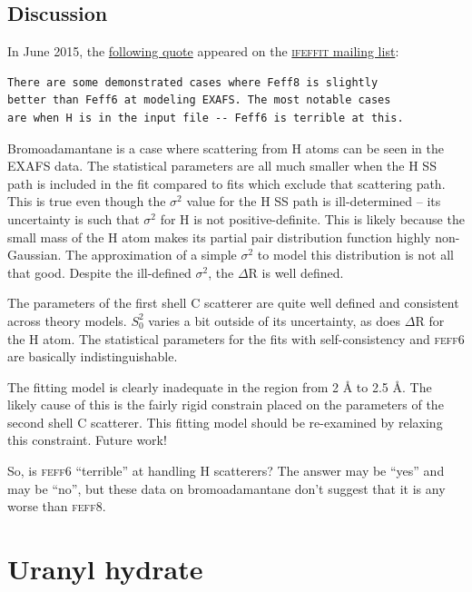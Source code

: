 \documentclass[11pt]{article}
\begin{document}
\subsection{Discussion}
\label{sec:orgheadline36}

In June 2015, the
\href{http://www.mail-archive.com/ifeffit@millenia.cars.aps.anl.gov/msg05040.html}{following
  quote} appeared on the
\href{http://cars9.uchicago.edu/mailman/listinfo/ifeffit/}{\textsc{ifeffit}
  mailing list}:

\begin{verbatim}
There are some demonstrated cases where Feff8 is slightly
better than Feff6 at modeling EXAFS. The most notable cases
are when H is in the input file -- Feff6 is terrible at this.
\end{verbatim}

Bromoadamantane is a case where scattering from H atoms can be seen in
the EXAFS data. The statistical parameters are all much smaller when
the H SS path is included in the fit compared to fits which exclude
that scattering path. This is true even though the $\sigma^2$ value
for the H SS path is ill-determined -- its uncertainty is such that
$\sigma^2$ for H is not positive-definite. This is likely because the
small mass of the H atom makes its partial pair distribution function
highly non-Gaussian. The approximation of a simple $\sigma^2$ to model
this distribution is not all that good. Despite the ill-defined
$\sigma^2$, the $\Delta$R is well defined.

The parameters of the first shell C scatterer are quite well defined and
consistent across theory models. $S_0^2$ varies a bit outside of its
uncertainty, as does $\Delta$R for the H atom. The statistical parameters for
the fits with self-consistency and \textsc{feff6} are basically
indistinguishable.

The fitting model is clearly inadequate in the region from 2 {\AA} to
2.5 {\AA}.  The likely cause of this is the fairly rigid constrain
placed on the parameters of the second shell C scatterer. This fitting
model should be re-examined by relaxing this constraint. Future work!

So, is \textsc{feff6} ``terrible'' at handling H scatterers? The
answer may be ``yes'' and may be ``no'', but these data on
bromoadamantane don't suggest that it is any worse than
\textsc{feff8}.


\section{Uranyl hydrate}
\label{sec:orgheadline43}
\end{document}

